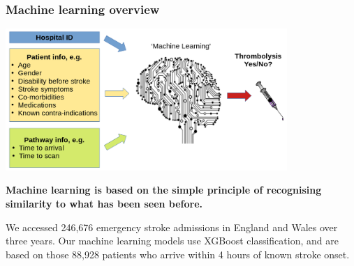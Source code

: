 \begin{frame}
\frametitle{Machine learning overview}
\begin{center}
\includegraphics[width=0.80\textwidth]{./images/ml_model_high_level}
\end{center}

\small
\textbf{Machine learning is based on the simple principle of recognising similarity to what has been seen before.}
\vspace{3mm}

We accessed 246,676 emergency stroke admissions in England and Wales over three years. Our machine learning models use XGBoost classification, and are based on those 88,928 patients who arrive within 4 hours of known stroke onset. 
\end{frame}